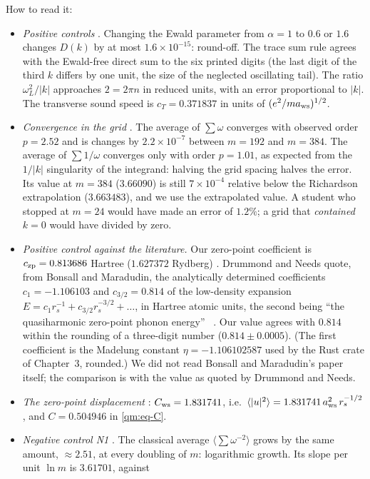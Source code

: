 How to read it:
\begin{itemize}
\item \emph{Positive controls} \tierX. Changing the Ewald parameter from $\alpha=1$ to $0.6$ or $1.6$ changes $D(k)$ by
at most $1.6\times10^{-15}$: round-off. The trace sum rule agrees with the Ewald-free direct sum to the six printed
digits (the last digit of the third $k$ differs by one unit, the size of the neglected oscillating tail). The ratio
$\omega_L^2/|k|$ approaches $2=2\pi n$ in reduced units, with an error proportional to $|k|$. The transverse sound
speed is $c_T=0.371837$ in units of $(e^2/ma_{\rm ws})^{1/2}$.
\item \emph{Convergence in the grid} \tierX. The average of $\sum\omega$ converges with observed order $p=2.52$ and is
changes by $2.2\times10^{-7}$ between $m=192$ and $m=384$. The average of $\sum1/\omega$ converges only with order
$p=1.01$, as expected from the $1/|k|$ singularity of the integrand: halving the grid spacing halves the error. Its
value at $m=384$ ($3.66090$) is still $7\times10^{-4}$ relative below the Richardson extrapolation ($3.663483$), and
we use the extrapolated value. A student who stopped at $m=24$ would have made an error of $1.2\%$; a grid that
\emph{contained} $k=0$ would have divided by zero.
\item \emph{Positive control against the literature.} Our zero-point coefficient is $c_{\rm zp}=0.813686$ Hartree
($1.627372$ Rydberg) \tierX. Drummond and Needs quote, from Bonsall and Maradudin, the analytically determined
coefficients $c_1=-1.106103$ and $c_{3/2}=0.814$ of the low-density expansion
$E=c_1r_s^{-1}+c_{3/2}r_s^{-3/2}+\dots$, in Hartree atomic units, the second being ``the quasiharmonic zero-point
phonon energy''~\cite{dn2009,bm} \tierL. Our value agrees with $0.814$ within the rounding of a three-digit number
($0.814\pm0.0005$). (The first coefficient is the Madelung constant $\eta=-1.106102587$ used by the Rust crate of
Chapter~3, rounded.) We did not read Bonsall and Maradudin's paper itself; the comparison is with the value as
quoted by Drummond and Needs.
\item \emph{The zero-point displacement} \tierX: $C_{\rm ws}=1.831741$, i.e.\
$\langle|u|^2\rangle=1.831741\,a_{\rm ws}^2\,r_s^{-1/2}$, and $C=0.504946$ in \eqref{qm:eq-C}.
\item \emph{Negative control N1} \tierX. The classical average $\langle\sum\omega^{-2}\rangle$ grows by the same amount,
$\approx2.51$, at every doubling of $m$: logarithmic growth. Its slope per unit $\ln m$ is $3.61701$, against

\end{itemize}
